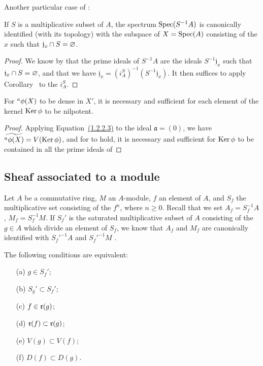 Another particular case of :
\begin{corollary}[1.2.6]
\label{I.1.2.6}
If $S$ is a multiplicative subset of $A$, the spectrum $\operatorname{Spec}(S^{-1}A)$ is canonically identified (with its topology) with the subspace of $X=\operatorname{Spec}(A)$ consisting of the $x$ such that $\mathfrak{j}_x\cap S=\varnothing$.
\end{corollary}

\begin{proof}
\label{proof-I.1.2.6}
We know by  that the prime ideals of $S^{-1}A$ are the ideals $S^{-1}\mathfrak{j}_x$ such that $\mathfrak{j}_x\cap S=\varnothing$, and that we have $\mathfrak{j}_x=(i_A^S)^{-1}(S^{-1}\mathfrak{j}_x)$.
It then suffices to apply Corollary~ to the $i_A^S$.
\end{proof}

\begin{corollary}[1.2.7]
\label{I.1.2.7}
For ${}^a\phi(X)$ to be dense in $X'$, it is necessary and sufficient for each element of the kernel $\operatorname{Ker}\phi$ to be nilpotent.
\end{corollary}

\begin{proof}
\label{proof-I.1.2.7}
Applying Equation~\hyperref[1.1.2.2]{(1.2.2.3)} to the ideal $\mathfrak{a}=(0)$, we have $\widetilde{{}^a\phi(X)}=V(\operatorname{Ker}\phi)$, and for  to hold, it is necessary and sufficient for $\operatorname{Ker}\phi$ to be contained in all the prime ideals of 
\end{proof}

\subsection{Sheaf associated to a module}
\label{subsection:I.1.3}

\begin{env}[1.3.1]
\label{I.1.3.1}
Let $A$ be a commutative ring, $M$ an $A$-module, $f$ an element of $A$, and $S_f$ the multiplicative set consisting of the $f^n$, where $n\geq 0$.
Recall that we set $A_f=S_f^{-1}A$, $M_f=S_f^{-1}M$.
If $S_f'$ is the saturated multiplicative subset of $A$ consisting of the $g\in A$ which divide an element of $S_f$, we know that $A_f$ and $M_f$ are canonically identified with ${S_f'}^{-1}A$ and ${S_f'}^{-1}M$ .
\end{env}

\begin{lemma}[1.3.2]
\label{I.1.3.2}
The following conditions are equivalent:
\begin{enumerate}
  \item[{\rm(a)}] $g\in S_f'$;
  \item[{\rm(b)}] $S_g'\subset S_f'$;
  \item[{\rm(c)}] $f\in\mathfrak{r}(g)$;
  \item[{\rm(d)}] $\mathfrak{r}(f)\subset\mathfrak{r}(g)$;
  \item[{\rm(e)}] $V(g)\subset V(f)$;
  \item[{\rm(f)}] $D(f)\subset D(g)$.
\end{enumerate}
\end{lemma}

